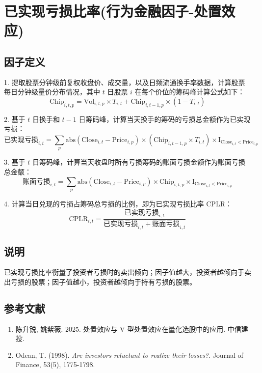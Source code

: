 \documentclass{article}
\begin{document}
\section{已实现亏损比率(行为金融因子-处置效应)}

\subsection{因子定义}

1. 提取股票分钟级前复权收盘价、成交量，以及日频流通换手率数据，计算股票每日分钟级量价分布情况，其中 \( t \) 日股票 \( i \) 在每个价位的筹码峰计算公式如下：
\begin{equation}
    \mathrm{Chip}_{i,t,p} = \mathrm{Vol}_{i,t,p} \times T_{i,t} + \mathrm{Chip}_{i,t-1,p} \times (1 - T_{i,t})
\end{equation}

2. 基于 \( t \) 日换手和 \( t-1 \) 日筹码峰，计算当天换手的筹码的亏损总金额作为已实现亏损：
\begin{equation}
    \text{已实现亏损}_{i,t} = \sum_p \mathrm{abs}(\mathrm{Close}_{i,t} - \mathrm{Price}_{i,p}) \times (\mathrm{Chip}_{i,t-1,p} \times T_{i,t}) \times \mathrm{I}_{\mathrm{Close}_{i,t} < \mathrm{Price}_{i,p}}
\end{equation}

3. 基于 \( t \) 日筹码峰，计算当天收盘时所有亏损筹码的账面亏损金额作为账面亏损总金额：
\begin{equation}
    \text{账面亏损}_{i,t} = \sum_p \mathrm{abs}(\mathrm{Close}_{i,t} - \mathrm{Price}_{i,p}) \times \mathrm{Chip}_{i,t,p} \times \mathrm{I}_{\mathrm{Close}_{i,t} < \mathrm{Price}_{i,p}}
\end{equation}

4. 计算当日兑现的亏损占筹码总亏损的比例，即为已实现亏损比率 \( \mathrm{CPLR} \)：
\begin{equation}
    \mathrm{CPLR}_{i,t} = \frac{\text{已实现亏损}_{i,t}}{\text{已实现亏损}_{i,t} + \text{账面亏损}_{i,t}}
\end{equation}

\subsection{说明}
已实现亏损比率衡量了投资者亏损时的卖出倾向；因子值越大，投资者越倾向于卖出亏损的股票；因子值越小，投资者越倾向于持有亏损的股票。

\subsection{参考文献}
\begin{enumerate}
    \item 陈升锐, 姚紫薇. 2025. 处置效应与 V 型处置效应在量化选股中的应用. 中信建投.
    \item Odean, T. (1998). \textit{Are investors reluctant to realize their losses?}. Journal of Finance, 53(5), 1775-1798.
\end{enumerate}
\end{document}
